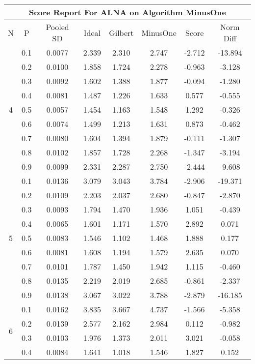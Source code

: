 \documentclass[11pt,a4paper]{report}
\begin{document}
\begin{longtable}{ | c | c || c | c | c | c | c | c | }
\hline
\multicolumn{8}{|c|}{ Score Report For ALNA on Algorithm MinusOne} \\
\hline
N & P & Pooled SD &  Ideal &  Gilbert & MinusOne  & Score & Norm Diff \\
 \hline
 \hline
 \endhead
\multirow{9}{*}{4} & 0.1 & 0.0077 & 2.339 & 2.310 & 2.747 & -2.712 & -13.894 \\
 & 0.2 & 0.0100 & 1.858 & 1.724 & 2.278 & -0.963 & -3.128 \\
 & 0.3 & 0.0092 & 1.602 & 1.388 & 1.877 & -0.094 & -1.280 \\
 & 0.4 & 0.0081 & 1.487 & 1.226 & 1.633 & 0.577 & -0.555 \\
 & 0.5 & 0.0057 & 1.454 & 1.163 & 1.548 & 1.292 & -0.326 \\
 & 0.6 & 0.0074 & 1.499 & 1.213 & 1.631 & 0.873 & -0.462 \\
 & 0.7 & 0.0080 & 1.604 & 1.394 & 1.879 & -0.111 & -1.307 \\
 & 0.8 & 0.0102 & 1.857 & 1.728 & 2.268 & -1.347 & -3.194 \\
 & 0.9 & 0.0099 & 2.331 & 2.287 & 2.750 & -2.444 & -9.608 \\
 \hline
\multirow{9}{*}{5} & 0.1 & 0.0136 & 3.079 & 3.043 & 3.784 & -2.906 & -19.371 \\
 & 0.2 & 0.0109 & 2.203 & 2.037 & 2.680 & -0.847 & -2.870 \\
 & 0.3 & 0.0093 & 1.794 & 1.470 & 1.936 & 1.051 & -0.439 \\
 & 0.4 & 0.0065 & 1.601 & 1.171 & 1.570 & 2.892 & 0.071 \\
 & 0.5 & 0.0083 & 1.546 & 1.102 & 1.468 & 1.888 & 0.177 \\
 & 0.6 & 0.0081 & 1.608 & 1.194 & 1.579 & 2.635 & 0.070 \\
 & 0.7 & 0.0101 & 1.787 & 1.450 & 1.942 & 1.115 & -0.460 \\
 & 0.8 & 0.0135 & 2.219 & 2.019 & 2.685 & -0.861 & -2.337 \\
 & 0.9 & 0.0138 & 3.067 & 3.022 & 3.788 & -2.879 & -16.185 \\
 \hline
\multirow{9}{*}{6} & 0.1 & 0.0162 & 3.835 & 3.667 & 4.737 & -1.566 & -5.358 \\
 & 0.2 & 0.0139 & 2.577 & 2.162 & 2.984 & 0.112 & -0.982 \\
 & 0.3 & 0.0103 & 1.976 & 1.373 & 2.011 & 3.021 & -0.058 \\
 & 0.4 & 0.0084 & 1.641 & 1.018 & 1.546 & 1.827 & 0.152 \\

\end{longtable}
\end{document}
